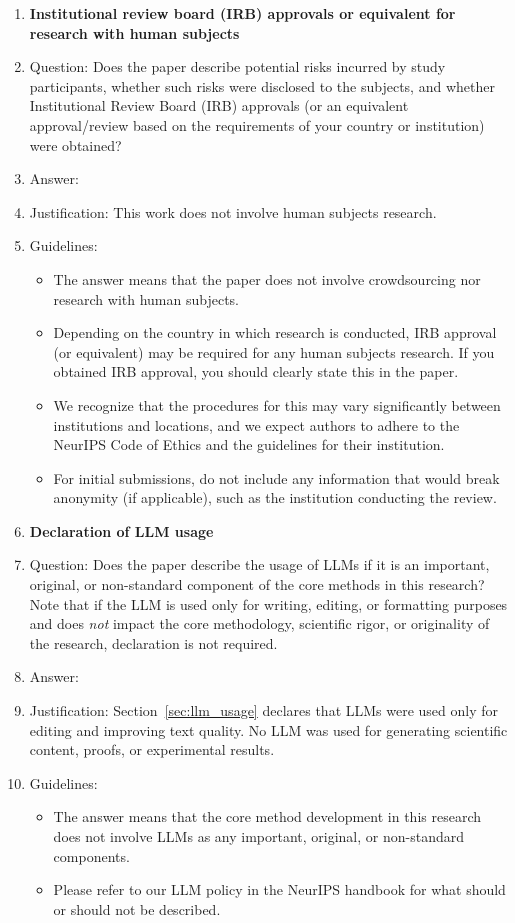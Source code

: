 \documentclass{article}
\begin{document}
\begin{enumerate}
\item {\bf Institutional review board (IRB) approvals or equivalent for research with human subjects}
    \item[] Question: Does the paper describe potential risks incurred by study participants, whether such risks were disclosed to the subjects, and whether Institutional Review Board (IRB) approvals (or an equivalent approval/review based on the requirements of your country or institution) were obtained?
    \item[] Answer: \answerNA{}
    \item[] Justification: This work does not involve human subjects research.
    \item[] Guidelines:
    \begin{itemize}
        \item The answer \answerNA{} means that the paper does not involve crowdsourcing nor research with human subjects.
        \item Depending on the country in which research is conducted, IRB approval (or equivalent) may be required for any human subjects research. If you obtained IRB approval, you should clearly state this in the paper. 
        \item We recognize that the procedures for this may vary significantly between institutions and locations, and we expect authors to adhere to the NeurIPS Code of Ethics and the guidelines for their institution. 
        \item For initial submissions, do not include any information that would break anonymity (if applicable), such as the institution conducting the review.
    \end{itemize}

\item {\bf Declaration of LLM usage}
    \item[] Question: Does the paper describe the usage of LLMs if it is an important, original, or non-standard component of the core methods in this research? Note that if the LLM is used only for writing, editing, or formatting purposes and does \emph{not} impact the core methodology, scientific rigor, or originality of the research, declaration is not required.
    \item[] Answer: \answerYes{}
    \item[] Justification: Section~\ref{sec:llm_usage} declares that LLMs were used only for editing and improving text quality. No LLM was used for generating scientific content, proofs, or experimental results.
    \item[] Guidelines:
    \begin{itemize}
        \item The answer \answerNA{} means that the core method development in this research does not involve LLMs as any important, original, or non-standard components.
        \item Please refer to our LLM policy in the NeurIPS handbook for what should or should not be described.
    \end{itemize}

\end{enumerate}
\end{document}
